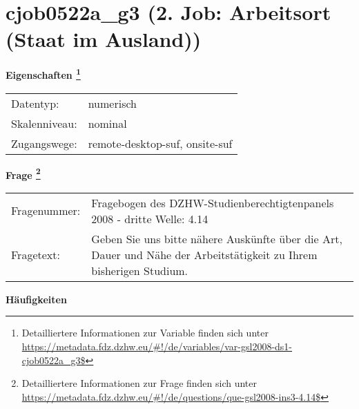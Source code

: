 
    \setcounter{footnote}{0}

    \vspace*{-1.8cm}
	\section{cjob0522a\_g3 (2. Job: Arbeitsort (Staat im Ausland))}
	\label{section:cjob0522a_g3}



    \vspace*{0.5cm}
    \noindent\textbf{Eigenschaften
	\footnote{Detailliertere Informationen zur Variable finden sich unter
		\url{https://metadata.fdz.dzhw.eu/\#!/de/variables/var-gsl2008-ds1-cjob0522a_g3$}}}\\
	\begin{tabularx}{\hsize}{@{}lX}
	Datentyp: & numerisch \\
	Skalenniveau: & nominal \\
	Zugangswege: &
	  remote-desktop-suf, 
	  onsite-suf
 \\
    \end{tabularx}



				\vspace*{0.5cm}
                \noindent\textbf{Frage
	                \footnote{Detailliertere Informationen zur Frage finden sich unter
		              \url{https://metadata.fdz.dzhw.eu/\#!/de/questions/que-gsl2008-ins3-4.14$}}}\\
				\begin{tabularx}{\hsize}{@{}lX}
					Fragenummer: &
					  Fragebogen des DZHW-Studienberechtigtenpanels 2008 - dritte Welle:
					  4.14
 \\
					Fragetext: & Geben Sie uns bitte nähere Auskünfte über die Art, Dauer und Nähe der Arbeitstätigkeit zu Ihrem bisherigen Studium. \\
				\end{tabularx}





        		\vspace*{0.5cm}
                \noindent\textbf{Häufigkeiten}

